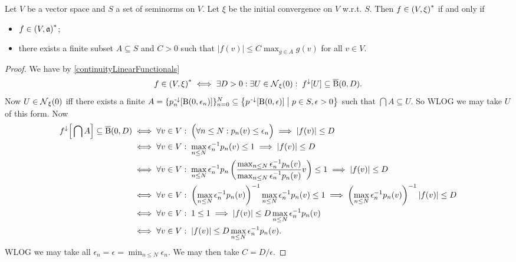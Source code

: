 \begin{proposition} \label{dualSeminormedConvergence}
Let $V$ be a vector space and $S$ a set of seminorms on $V$. Let $\xi$ be the initial convergence on $V$ w.r.t. $S$. Then $f\in \sSet{V, \xi}^*$ \textup{if and only if}
\begin{itemize}
\item $f\in \sSet{V,\mathfrak{a}}^*$;
\item there exists a finite subset $A\subseteq S$ and $C>0$ such that $|f(v)| \leq C\max_{g\in A} g(v)$ for all $v\in V$.
\end{itemize}
\end{proposition}
\begin{proof}
We have by \ref{continuityLinearFunctionals}
\[ f\in \sSet{V, \xi}^* \iff \exists D>0: \exists U\in \neighbourhood_\xi(0):\; f^\imf[U] \subseteq \cball(0,D). \]
Now $U\in \operatorname{\mathcal{N}}_\xi(0)$ iff there exists a finite $A = \{p_n^\preimf[\ball(0,\epsilon_n)]\}_{n=0}^N \subseteq \setbuilder{p^\preimf[\ball(0,\epsilon)]}{p\in S, \epsilon > 0}$ such that $\bigcap A\subseteq U$. So WLOG we may take $U$ of this form.
Now 
\begin{align*}
f^\downarrow\Big[\bigcap A\Big] \subseteq \operatorname{\overline{B}}(0,D) &\iff \forall v\in V: \; \Big(\forall n\leq N: p_n(v)\leq \epsilon_n \Big) \implies |f(v)|\leq D \\
&\iff \forall v\in V: \; \max_{n\leq N}\epsilon_n^{-1}p_n(v)\leq 1 \implies |f(v)|\leq D \\
&\iff \forall v\in V: \; \max_{n\leq N}\epsilon_n^{-1}p_n\left(\frac{\max_{n\leq N}\epsilon_n^{-1}p_n(v)}{\max_{n\leq N}\epsilon_n^{-1}p_n(v)} v\right)\leq 1 \implies |f(v)|\leq D \\
&\iff \forall v\in V: \; \left(\max_{n\leq N}\epsilon_n^{-1}p_n(v)\right)^{-1}\max_{n\leq N}\epsilon_n^{-1}p_n(v)\leq 1 \implies \left(\max_{n\leq N}\epsilon_n^{-1}p_n(v)\right)^{-1}|f(v)|\leq D \\
&\iff \forall v\in V: \; 1\leq 1 \implies |f(v)|\leq D\max_{n\leq N}\epsilon_n^{-1}p_n(v) \\
&\iff \forall v\in V: \; |f(v)|\leq D\max_{n\leq N}\epsilon_n^{-1}p_n(v).
\end{align*}
WLOG we may take all $\epsilon_n = \epsilon = \min_{n\leq N}\epsilon_n$. We may then take $C = D/\epsilon$.
\end{proof}


